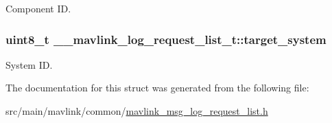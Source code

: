 Component I\+D. 

\hypertarget{struct____mavlink__log__request__list__t_ac694149d3f3a2607e6c12d03551bb48d}{
\subsubsection[{target\+\_\+system}]{\setlength{\rightskip}{0pt plus 5cm}uint8\+\_\+t \+\_\+\+\_\+mavlink\+\_\+log\+\_\+request\+\_\+list\+\_\+t\+::target\+\_\+system}}\label{struct____mavlink__log__request__list__t_ac694149d3f3a2607e6c12d03551bb48d}


System I\+D. 



The documentation for this struct was generated from the following file\+:\begin{DoxyCompactItemize}
\item 
src/main/mavlink/common/\hyperlink{mavlink__msg__log__request__list_8h}{mavlink\+\_\+msg\+\_\+log\+\_\+request\+\_\+list.\+h}\end{DoxyCompactItemize}

